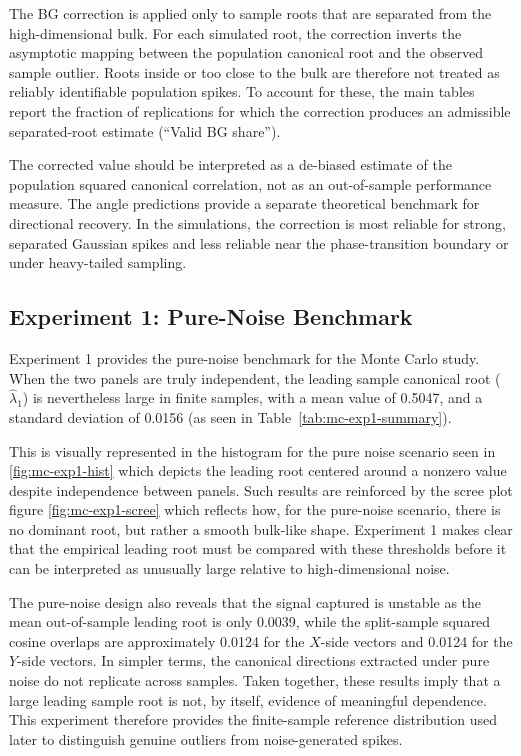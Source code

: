 \documentclass[12pt]{report} %
\begin{document}
The BG correction is applied only to sample roots that are separated from the 
high-dimensional bulk. For each simulated root, the correction inverts the 
asymptotic mapping between the population canonical root and the observed 
sample outlier. Roots inside or too close to the bulk are therefore not treated as 
reliably identifiable population spikes. To account for these, the main tables report
the fraction of replications for which the correction produces an admissible 
separated-root estimate (``Valid BG share'').

The corrected value should be interpreted as a de-biased estimate of the population 
squared canonical correlation, not as an out-of-sample performance measure. 
The angle predictions provide a separate theoretical benchmark for directional recovery. 
In the simulations, the correction is most reliable for strong, separated Gaussian 
spikes and less reliable near the phase-transition boundary or under heavy-tailed 
sampling.

\subsection*{Experiment 1: Pure-Noise Benchmark}

Experiment 1 provides the pure-noise benchmark for the Monte Carlo study. When the two panels are truly 
independent, the leading sample canonical root ($\hat\lambda_1$) is nevertheless large in finite samples, 
with a mean value of 0.5047, and a standard deviation of 0.0156 (as seen in Table~\ref{tab:mc-exp1-summary}).

This is visually represented in the histogram for the pure noise scenario seen in \autoref{fig:mc-exp1-hist} 
which depicts the leading root centered around a nonzero value despite independence between panels. 
Such results are reinforced by the scree plot figure \autoref{fig:mc-exp1-scree} which reflects how, 
for the pure-noise scenario, there is no dominant root, but rather a smooth bulk-like shape. 
Experiment 1 makes clear that the empirical leading root must be compared with these thresholds before it can be interpreted 
as unusually large relative to high-dimensional noise.

The pure-noise design also reveals that the signal captured is unstable as the mean out-of-sample leading 
root is only 0.0039, while the split-sample squared cosine overlaps are approximately 0.0124 for the 
$X$-side vectors and 0.0124 for the $Y$-side vectors. In simpler terms, the canonical directions extracted 
under pure noise do not replicate across samples. Taken together, these results imply that a large leading 
sample root is not, by itself, evidence of meaningful dependence. This experiment therefore provides the 
finite-sample reference distribution used later to distinguish genuine outliers from noise-generated spikes.
\end{document}
